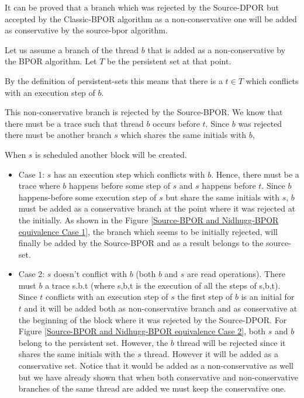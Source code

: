 It can be proved that a branch which was rejected by the Source-DPOR but accepted by the Classic-BPOR algorithm as a
non-conservative one will be added as conservative by the source-bpor algorithm.

Let us assume a branch of the thread $b$ that is added as a non-conservative by the BPOR algorithm. Let $T$ be the
persistent set at that point.

By the definition of persistent-sets this means that there is a $t \in T$ which
conflicts with an execution step of $b$. 

This non-conservative branch is rejected by the Source-BPOR. We know that there must be a trace such that thread $b$
 occurs before $t$. Since $b$ was rejected there must be another branch $s$ which shares the same initials with $b$, 
  
When $s$ is scheduled another block will be created.
 
\begin{itemize}

\item Case 1: $s$ has an execution step which conflicts with $b$. Hence, there must be a trace where $b$ happens before
some step of $s$ and $s$ happens before $t$. Since $b$ happens-before some execution step of $s$ but share the same
initials with $s$, $b$ must be added as a conservative branch at the point where it was rejected at the initially. As
shown in the Figure \ref{Source-BPOR and Nidhugg-BPOR equivalence Case 1}, the branch which seems to be initially
rejected, will finally be added by the Source-BPOR and as a result belongs to the source-set. 
   
\item Case 2: $s$ doesn’t conflict with $b$ (both $b$ and $s$ are read operations). There must $b$ a trace s.b.t (where
   s,b,t is the execution of all the steps of s,b,t). Since $t$ conflicts with an execution step of $s$ the first step
   of $b$ is an initial for $t$ and it will be added both as non-conservative branch and as conservative at the
   beginning of the block where it was rejected by the Source-DPOR. For Figure \ref{Source-BPOR and Nidhugg-BPOR
   equivalence Case 2}, both $s$ and $b$ belong to the persistent set. However, the $b$ thread will be rejected since it
   shares the same initials with the $s$ thread. However it will be added as a conservative set. Notice that it would be
   added as a non-conservative as well but we have already shown that when both conservative and non-conservative
   branches of the same thread are added we must keep the conservative one.


\end{itemize}
   

